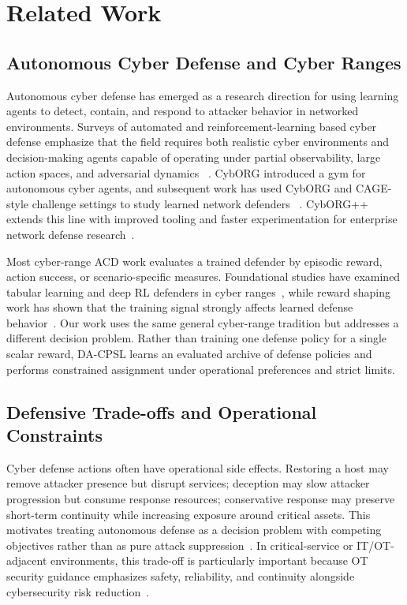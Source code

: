\documentclass[sigconf,review,anonymous]{acmart}
\begin{document}
\section{Related Work}
\label{sec:related-work}

\subsection{Autonomous Cyber Defense and Cyber Ranges}

Autonomous cyber defense has emerged as a research direction for using
learning agents to detect, contain, and respond to attacker behavior in
networked environments. Surveys of automated and reinforcement-learning
based cyber defense emphasize that the field requires both realistic
cyber environments and decision-making agents capable of operating under
partial observability, large action spaces, and adversarial dynamics
~\cite{vyas2023automated,palmer2023drlsurvey,thompson2024entity,palmer2025egta}. CybORG introduced a gym
for autonomous cyber agents, and subsequent work has used CybORG and
CAGE-style challenge settings to study learned network defenders
~\cite{standen2021cyborg,foley2022autonomous}. CybORG++ extends this
line with improved tooling and faster experimentation for enterprise
network defense research~\cite{emerson2024cyborgpp}.

Most cyber-range ACD work evaluates a trained defender by episodic
reward, action success, or scenario-specific measures. Foundational
studies have examined tabular learning and deep RL defenders in cyber
ranges~\cite{applebaum2022bridging,foley2022autonomous}, while reward
shaping work has shown that the training signal strongly affects learned
defense behavior~\cite{bates2023reward}. Our work uses the same general
cyber-range tradition but addresses a different decision problem. Rather
than training one defense policy for a single scalar reward, DA-CPSL
learns an evaluated archive of defense policies and performs constrained
assignment under operational preferences and strict limits.

\subsection{Defensive Trade-offs and Operational Constraints}

Cyber defense actions often have operational side effects. Restoring a
host may remove attacker presence but disrupt services; deception may
slow attacker progression but consume response resources; conservative
response may preserve short-term continuity while increasing exposure
around critical assets. This motivates treating autonomous defense as a
decision problem with competing objectives rather than as pure attack
suppression~\cite{odriscoll2024morlcyber}. In critical-service or IT/OT-adjacent environments, this
trade-off is particularly important because OT security guidance
emphasizes safety, reliability, and continuity alongside cybersecurity
risk reduction~\cite{nist_sp80082r3}.
\end{document}
